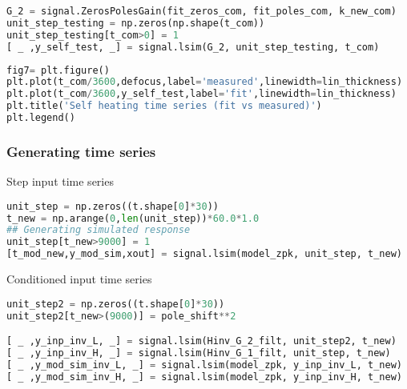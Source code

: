 
\begin{spacing}{1.2} \begin{lstlisting}[frame=single,language=Python]
G_2 = signal.ZerosPolesGain(fit_zeros_com, fit_poles_com, k_new_com)
unit_step_testing = np.zeros(np.shape(t_com))
unit_step_testing[t_com>0] = 1
[ _ ,y_self_test, _] = signal.lsim(G_2, unit_step_testing, t_com)
\end{lstlisting} \end{spacing}

\begin{spacing}{1.2} \begin{lstlisting}[frame=single,language=Python]
fig7= plt.figure()
plt.plot(t_com/3600,defocus,label='measured',linewidth=lin_thickness)
plt.plot(t_com/3600,y_self_test,label='fit',linewidth=lin_thickness)
plt.title('Self heating time series (fit vs measured)')
plt.legend()
\end{lstlisting} \end{spacing}


\subsubsection*{Generating time series}

\noindent Step input time series

\begin{spacing}{1.2} \begin{lstlisting}[frame=single,language=Python]
unit_step = np.zeros((t.shape[0]*30))
t_new = np.arange(0,len(unit_step))*60.0*1.0
## Generating simulated response
unit_step[t_new>9000] = 1
[t_mod_new,y_mod_sim,xout] = signal.lsim(model_zpk, unit_step, t_new)
\end{lstlisting} \end{spacing}


\noindent Conditioned input time series

\begin{spacing}{1.2} \begin{lstlisting}[frame=single,language=Python]
unit_step2 = np.zeros((t.shape[0]*30))
unit_step2[t_new>(9000)] = pole_shift**2

[ _ ,y_inp_inv_L, _] = signal.lsim(Hinv_G_2_filt, unit_step2, t_new)
[ _ ,y_inp_inv_H, _] = signal.lsim(Hinv_G_1_filt, unit_step, t_new)
[ _ ,y_mod_sim_inv_L, _] = signal.lsim(model_zpk, y_inp_inv_L, t_new)
[ _ ,y_mod_sim_inv_H, _] = signal.lsim(model_zpk, y_inp_inv_H, t_new)
\end{lstlisting} \end{spacing}



